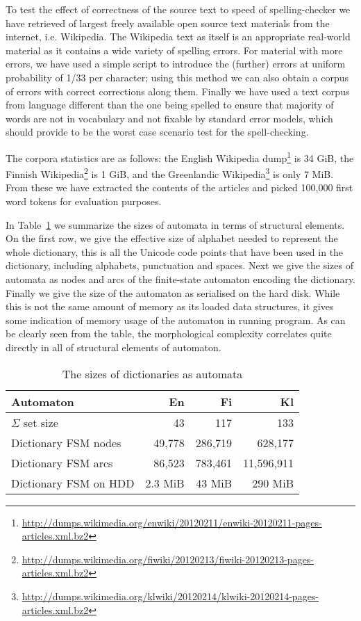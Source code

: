 \documentclass[11pt]{article}
\begin{document}
To test the effect of correctness of the source text to speed of
spelling-checker we have retrieved of largest freely available open source text
materials from the internet, i.e. Wikipedia. The Wikipedia text as itself is
an appropriate real-world material as it contains a wide variety of spelling
errors. For material with more errors, we have used a simple script to
introduce the (further) errors at uniform probability of 1/33 per character;
using this method we can also obtain a corpus of errors with correct
corrections along them. Finally we have used a text corpus from language
different than the one being spelled to ensure that majority of words are not
in vocabulary and not fixable by standard error models, which should provide to
be the worst case scenario test for the spell-checking.

The corpora statistics are as follows: the English Wikipedia
dump\footnote{\url{http://dumps.wikimedia.org/enwiki/20120211/enwiki-20120211-pages-articles.xml.bz2}}
is 34 GiB, the Finnish
Wikipedia\footnote{\url{http://dumps.wikimedia.org/fiwiki/20120213/fiwiki-20120213-pages-articles.xml.bz2}}
is 1 GiB, and the Greenlandic
Wikipedia\footnote{\url{http://dumps.wikimedia.org/klwiki/20120214/klwiki-20120214-pages-articles.xml.bz2}}
is only 7 MiB. From these we have extracted the contents of the articles and
picked 100,000 first word tokens for evaluation purposes.

In Table~\ref{table:dictionary-sizes} we summarize the sizes of automata in
terms of structural elements. On the first row, we give the effective size of
alphabet needed to represent the whole dictionary, this is all the Unicode
code points that have been used in the dictionary, including alphabets, 
punctuation and spaces. Next we give the sizes of automata as nodes and
arcs of the finite-state automaton encoding the dictionary. Finally we give the
size of the automaton as serialised on the hard disk. While this is not the
same amount of memory as its loaded data structures, it gives some indication
of memory usage of the automaton in running program. As can be clearly
seen from the table, the morphological complexity correlates quite directly
in all of structural elements of automaton.

\begin{table}[h]
\begin{center}
\begin{scriptsize}
\begin{tabular}{|l|rrr|}
\hline
\bf Automaton & \bf En & \bf Fi & \bf Kl  \\ 
\hline
$\Sigma$ set size &
 43& 117& 133
\\
Dictionary FSM nodes &
 49,778& 286,719& 628,177
\\
Dictionary FSM arcs &
 86,523& 783,461& 11,596,911
\\
Dictionary FSM on HDD & 
2.3 MiB &
43 MiB &
290 MiB
\\
\hline
\end{tabular}
\end{scriptsize}
\end{center}
\caption{\label{table:dictionary-sizes}
The sizes of dictionaries as automata}
\end{table}
\end{document}
